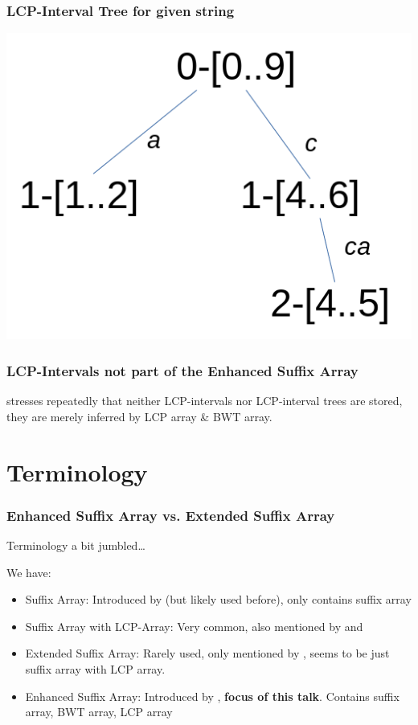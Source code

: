 \documentclass[compress,handout]{beamer} %
\begin{document}
\begin{frame}
	\frametitle{LCP-Interval Tree for given string}
	\includegraphics[width=\textwidth, height=\textheight, keepaspectratio=true]{lcp_interval_tree}
\end{frame}

\begin{frame}
	\frametitle{LCP-Intervals not part of the Enhanced Suffix Array}
	\citealt{abouelhoda2002enhanced} stresses repeatedly that neither
	LCP-intervals nor LCP-interval trees are stored, they are merely
	inferred by LCP array \& BWT array.
\end{frame}

\section{Terminology}

\begin{frame}
	\frametitle{Enhanced Suffix Array vs. Extended Suffix Array}
	Terminology a bit jumbled…

	We have:
	\begin{itemize}
		\item Suffix Array: Introduced by \citealt{manber1993suffix} (but likely used before), only contains suffix array
		\item Suffix Array with LCP-Array: Very common, also mentioned by \citealt{manber1993suffix} and \citealt{gusfield1997algorithms}
		\item Extended Suffix Array: Rarely used, only mentioned by \citealt{salson2010dynamic}, seems to be just suffix array with LCP array.
		\item Enhanced Suffix Array: Introduced by \citealt{abouelhoda2002enhanced}, \textbf{focus of this talk}. Contains suffix array, BWT array, LCP array
	\end{itemize}
\end{frame}
\end{document}
